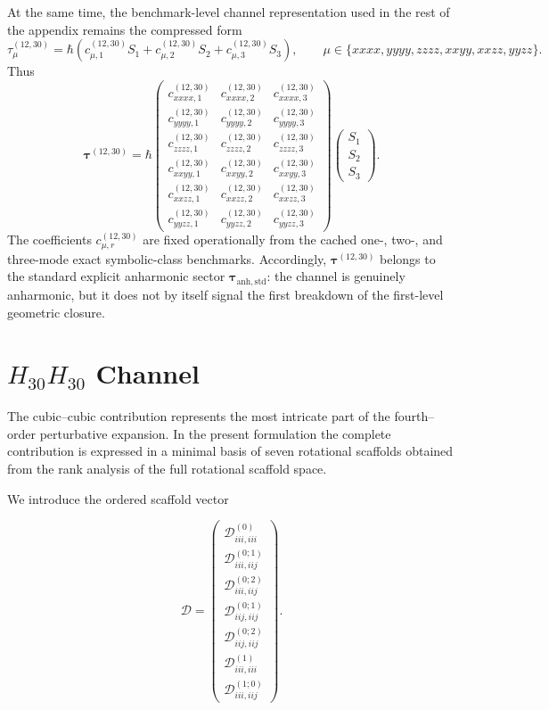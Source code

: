 \documentclass[aip,jcp,reprint]{revtex4-2}
\begin{document}
\begin{widetext}
At the same time, the benchmark-level channel representation used in the
rest of the appendix remains the compressed form
\begin{equation}
\tau^{(12,30)}_\mu = \hbar\left(
 c^{(12,30)}_{\mu,1} S_1 +
 c^{(12,30)}_{\mu,2} S_2 +
 c^{(12,30)}_{\mu,3} S_3
\right),
\qquad
\mu \in \{xxxx,yyyy,zzzz,xxyy,xxzz,yyzz\}.
\end{equation}
Thus
\begin{equation}
\bm{\tau}^{(12,30)} = \hbar
\begin{pmatrix}
 c^{(12,30)}_{xxxx,1} & c^{(12,30)}_{xxxx,2} & c^{(12,30)}_{xxxx,3} \\
 c^{(12,30)}_{yyyy,1} & c^{(12,30)}_{yyyy,2} & c^{(12,30)}_{yyyy,3} \\
 c^{(12,30)}_{zzzz,1} & c^{(12,30)}_{zzzz,2} & c^{(12,30)}_{zzzz,3} \\
 c^{(12,30)}_{xxyy,1} & c^{(12,30)}_{xxyy,2} & c^{(12,30)}_{xxyy,3} \\
 c^{(12,30)}_{xxzz,1} & c^{(12,30)}_{xxzz,2} & c^{(12,30)}_{xxzz,3} \\
 c^{(12,30)}_{yyzz,1} & c^{(12,30)}_{yyzz,2} & c^{(12,30)}_{yyzz,3}
\end{pmatrix}
\begin{pmatrix}
S_1 \\
S_2 \\
S_3
\end{pmatrix}.
\end{equation}
The coefficients $c^{(12,30)}_{\mu,r}$ are fixed operationally from the cached
one-, two-, and three-mode exact symbolic-class benchmarks.
Accordingly, $\bm{\tau}^{(12,30)}$ belongs to the standard explicit
anharmonic sector $\bm{\tau}_{\mathrm{anh,std}}$: the channel is
genuinely anharmonic, but it does not by itself signal the first
breakdown of the first-level geometric closure.

\section{$H_{30}H_{30}$ Channel}

The cubic--cubic contribution represents the most intricate part of the
fourth--order perturbative expansion. In the present formulation the
complete contribution is expressed in a minimal basis of seven rotational
scaffolds obtained from the rank analysis of the full rotational scaffold
space.

We introduce the ordered scaffold vector

\begin{equation}
\bm{\mathcal{D}} =
\begin{pmatrix}
\mathcal{D}^{(0)}_{iii,iii} \\
\mathcal{D}^{(0;1)}_{iii,iij} \\
\mathcal{D}^{(0;2)}_{iii,iij} \\
\mathcal{D}^{(0;1)}_{iij,iij} \\
\mathcal{D}^{(0;2)}_{iij,iij} \\
\mathcal{D}^{(1)}_{iii,iii} \\
\mathcal{D}^{(1;0)}_{iii,iij}
\end{pmatrix}.
\end{equation}


\end{widetext}
\end{document}
